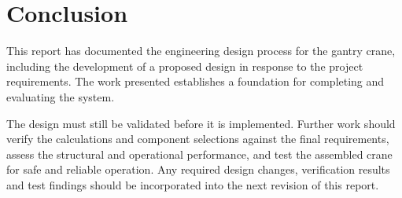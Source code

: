 \chapter{Conclusion}
\label{ch:conclusion}

This report has documented the engineering design process for the gantry crane, including the development of a proposed design in response to the project requirements. The work presented establishes a foundation for completing and evaluating the system.

The design must still be validated before it is implemented. Further work should verify the calculations and component selections against the final requirements, assess the structural and operational performance, and test the assembled crane for safe and reliable operation. Any required design changes, verification results and test findings should be incorporated into the next revision of this report.